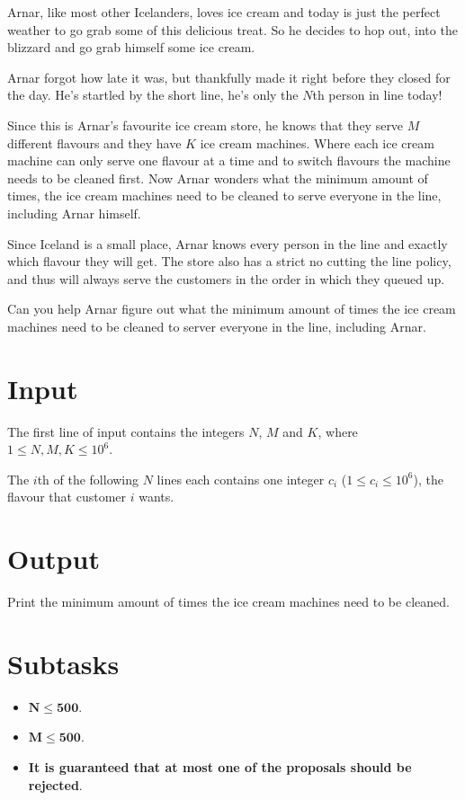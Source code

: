 Arnar, like most other Icelanders, loves ice cream and today is just the perfect
weather to go grab some of this delicious treat. So he decides to hop out, into
the blizzard and go grab himself some ice cream.

Arnar forgot how late it was, but thankfully made it right before they closed
for the day. He's startled by the short line, he's only the $N$th person in
line today!

Since this is Arnar's favourite ice cream store, he knows that they serve $M$
different flavours and they have $K$ ice cream machines.
Where each ice cream machine can only serve one flavour at a time and to switch
flavours the machine needs to be cleaned first.
Now Arnar wonders what the minimum amount of times, the ice cream machines
need to be cleaned to serve everyone in the line, including Arnar himself.

Since Iceland is a small place, Arnar knows every person in the line and exactly
which flavour they will get.
The store also has a strict no cutting the line policy, and thus will always serve
the customers in the order in which they queued up.

Can you help Arnar figure out what the minimum amount of times the ice cream
machines need to be cleaned to server everyone in the line, including Arnar.

\section*{Input}
The first line of input contains the integers $N$, $M$ and $K$, where $1 \leq
N, M, K \leq 10^6$.

The $i$th of the following $N$ lines each contains one integer $c_i$
($1 \leq c_i \leq 10^6$), the flavour that customer $i$ wants.

\section*{Output}
Print the minimum amount of times the ice cream machines need to be cleaned.

\section*{Subtasks}
\begin{itemize}
    \item $\mathbf{N} \mathbf{\leq} \mathbf{500}$.
    \item $\mathbf{M} \mathbf{\leq} \mathbf{500}$.
    \item \textbf{It is guaranteed that at most one of the proposals should be
    rejected}.
\end{itemize}


